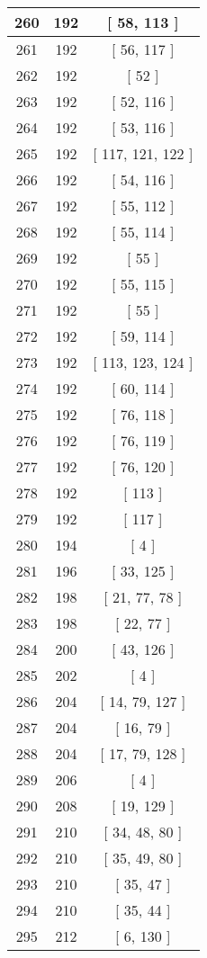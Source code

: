 \begin{center}
\begin{longtable}[H]{|| c c c ||}
\\\hline
260 & 192 & [ 58, 113 ]
\\\hline
261 & 192 & [ 56, 117 ]
\\\hline
262 & 192 & [ 52 ]
\\\hline
263 & 192 & [ 52, 116 ]
\\\hline
264 & 192 & [ 53, 116 ]
\\\hline
265 & 192 & [ 117, 121, 122 ]
\\\hline
266 & 192 & [ 54, 116 ]
\\\hline
267 & 192 & [ 55, 112 ]
\\\hline
268 & 192 & [ 55, 114 ]
\\\hline
269 & 192 & [ 55 ]
\\\hline
270 & 192 & [ 55, 115 ]
\\\hline
271 & 192 & [ 55 ]
\\\hline
272 & 192 & [ 59, 114 ]
\\\hline
273 & 192 & [ 113, 123, 124 ]
\\\hline
274 & 192 & [ 60, 114 ]
\\\hline
275 & 192 & [ 76, 118 ]
\\\hline
276 & 192 & [ 76, 119 ]
\\\hline
277 & 192 & [ 76, 120 ]
\\\hline
278 & 192 & [ 113 ]
\\\hline
279 & 192 & [ 117 ]
\\\hline
280 & 194 & [ 4 ]
\\\hline
281 & 196 & [ 33, 125 ]
\\\hline
282 & 198 & [ 21, 77, 78 ]
\\\hline
283 & 198 & [ 22, 77 ]
\\\hline
284 & 200 & [ 43, 126 ]
\\\hline
285 & 202 & [ 4 ]
\\\hline
286 & 204 & [ 14, 79, 127 ]
\\\hline
287 & 204 & [ 16, 79 ]
\\\hline
288 & 204 & [ 17, 79, 128 ]
\\\hline
289 & 206 & [ 4 ]
\\\hline
290 & 208 & [ 19, 129 ]
\\\hline
291 & 210 & [ 34, 48, 80 ]
\\\hline
292 & 210 & [ 35, 49, 80 ]
\\\hline
293 & 210 & [ 35, 47 ]
\\\hline
294 & 210 & [ 35, 44 ]
\\\hline
295 & 212 & [ 6, 130 ]

\end{longtable}
\end{center}
